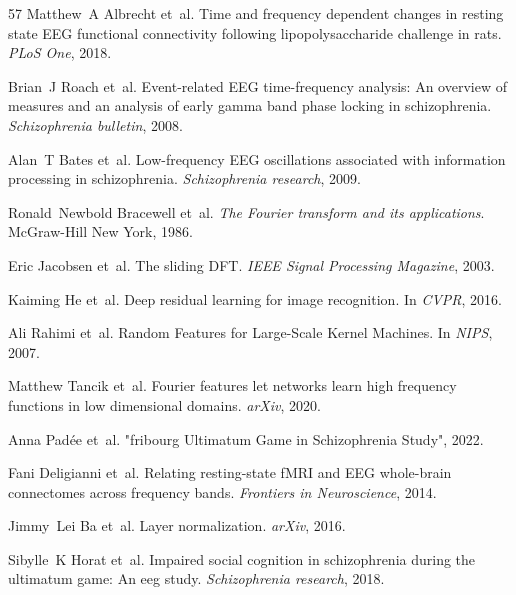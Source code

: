 \documentclass{article}
\begin{document}
\begin{thebibliography}{57}
Matthew~A Albrecht et~al.
\newblock Time and frequency dependent changes in resting state {EEG} functional connectivity following lipopolysaccharide challenge in rats.
\newblock \emph{PLoS One}, 2018.

Brian~J Roach et~al.
\newblock Event-related {EEG} time-frequency analysis: {A}n overview of measures and an analysis of early gamma band phase locking in schizophrenia.
\newblock \emph{Schizophrenia bulletin}, 2008.

Alan~T Bates et~al.
\newblock Low-frequency {EEG} oscillations associated with information processing in schizophrenia.
\newblock \emph{Schizophrenia research}, 2009.

Ronald~Newbold Bracewell et~al.
\newblock \emph{The {F}ourier transform and its applications}.
\newblock McGraw-Hill New York, 1986.

Eric Jacobsen et~al.
\newblock The sliding {DFT}.
\newblock \emph{{IEEE} Signal Processing Magazine}, 2003.

Kaiming He et~al.
\newblock Deep residual learning for image recognition.
\newblock In \emph{CVPR}, 2016.

Ali Rahimi et~al.
\newblock Random {F}eatures for {L}arge-{S}cale {K}ernel {M}achines.
\newblock In \emph{NIPS}, 2007.

Matthew Tancik et~al.
\newblock Fourier features let networks learn high frequency functions in low dimensional domains.
\newblock \emph{arXiv}, 2020.

Anna Padée et~al.
\newblock "fribourg {U}ltimatum {G}ame in {S}chizophrenia {S}tudy", 2022.

Fani Deligianni et~al.
\newblock Relating resting-state f{MRI} and {EEG} whole-brain connectomes across frequency bands.
\newblock \emph{Frontiers in Neuroscience}, 2014.

Jimmy~Lei Ba et~al.
\newblock Layer normalization.
\newblock \emph{ar{X}iv}, 2016.

Sibylle~K Horat et~al.
\newblock Impaired social cognition in schizophrenia during the ultimatum game: An eeg study.
\newblock \emph{Schizophrenia research}, 2018.


\end{thebibliography}
\end{document}
